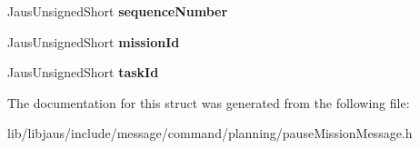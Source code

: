\begin{DoxyCompactItemize}
\item 
\hypertarget{struct_pause_mission_message_struct_a9a9158cbd1a6d720c3219180fb1629ed}{\-Jaus\-Unsigned\-Short {\bfseries sequence\-Number}}\label{struct_pause_mission_message_struct_a9a9158cbd1a6d720c3219180fb1629ed}

\item 
\hypertarget{struct_pause_mission_message_struct_a69e8eb2fe9f143090c53415e94ae2f48}{\-Jaus\-Unsigned\-Short {\bfseries mission\-Id}}\label{struct_pause_mission_message_struct_a69e8eb2fe9f143090c53415e94ae2f48}

\item 
\hypertarget{struct_pause_mission_message_struct_a27d4237a6cb01bac33e5835027cd6a86}{\-Jaus\-Unsigned\-Short {\bfseries task\-Id}}\label{struct_pause_mission_message_struct_a27d4237a6cb01bac33e5835027cd6a86}

\end{DoxyCompactItemize}


\-The documentation for this struct was generated from the following file\-:\begin{DoxyCompactItemize}
\item 
lib/libjaus/include/message/command/planning/pause\-Mission\-Message.\-h\end{DoxyCompactItemize}
